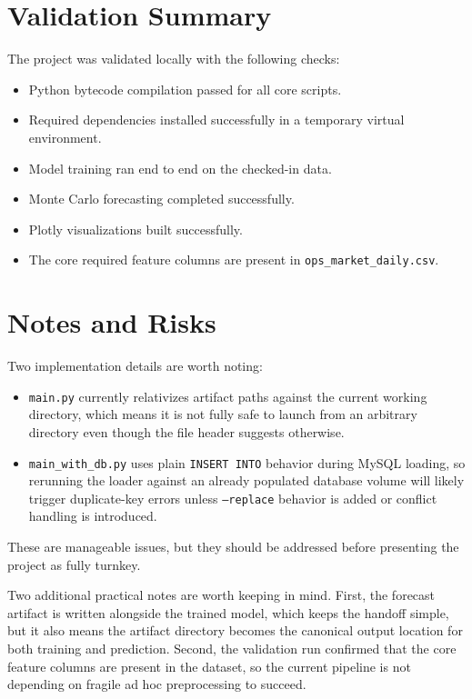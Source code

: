 \documentclass[conference]{IEEEtran}
\begin{document}
\section{Validation Summary}

The project was validated locally with the following checks:

\begin{itemize}
  \item Python bytecode compilation passed for all core scripts.
  \item Required dependencies installed successfully in a temporary virtual environment.
  \item Model training ran end to end on the checked-in data.
  \item Monte Carlo forecasting completed successfully.
  \item Plotly visualizations built successfully.
  \item The core required feature columns are present in \texttt{ops\_market\_daily.csv}.
\end{itemize}

\section{Notes and Risks}

Two implementation details are worth noting:

\begin{itemize}
  \item \texttt{main.py} currently relativizes artifact paths against the current working directory, which means it is not fully safe to launch from an arbitrary directory even though the file header suggests otherwise.
  \item \texttt{main\_with\_db.py} uses plain \texttt{INSERT INTO} behavior during MySQL loading, so rerunning the loader against an already populated database volume will likely trigger duplicate-key errors unless \texttt{--replace} behavior is added or conflict handling is introduced.
\end{itemize}

These are manageable issues, but they should be addressed before presenting the project as fully turnkey.

Two additional practical notes are worth keeping in mind. First, the forecast artifact is written alongside the trained model, which keeps the handoff simple, but it also means the artifact directory becomes the canonical output location for both training and prediction. Second, the validation run confirmed that the core feature columns are present in the dataset, so the current pipeline is not depending on fragile ad hoc preprocessing to succeed.
\end{document}
